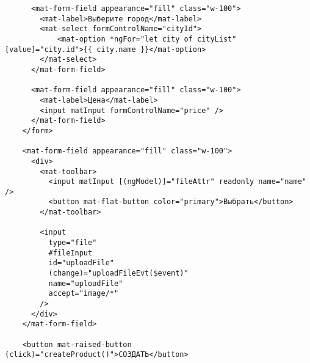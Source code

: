 \begin{lstlisting}
      <mat-form-field appearance="fill" class="w-100">
        <mat-label>Выберите город</mat-label>
        <mat-select formControlName="cityId">
            <mat-option *ngFor="let city of cityList" [value]="city.id">{{ city.name }}</mat-option>
        </mat-select>
      </mat-form-field>
    
      <mat-form-field appearance="fill" class="w-100">
        <mat-label>Цена</mat-label>
        <input matInput formControlName="price" />
      </mat-form-field>
    </form>
    
    <mat-form-field appearance="fill" class="w-100">
      <div>
        <mat-toolbar>
          <input matInput [(ngModel)]="fileAttr" readonly name="name" />
          <button mat-flat-button color="primary">Выбрать</button>
        </mat-toolbar>
    
        <input
          type="file"
          #fileInput
          id="uploadFile"
          (change)="uploadFileEvt($event)"
          name="uploadFile"
          accept="image/*"
        />
      </div>
    </mat-form-field>
    
    <button mat-raised-button (click)="createProduct()">СОЗДАТЬ</button>    
\end{lstlisting}


